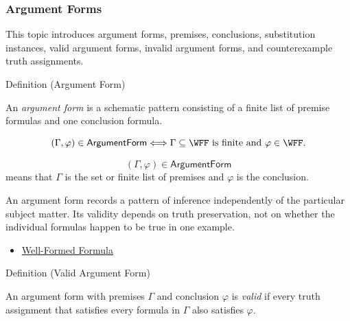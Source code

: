 \subsubsection*{Argument Forms}

\begin{remark*}
This topic introduces argument forms, premises, conclusions, substitution
instances, valid argument forms, invalid argument forms, and counterexample
truth assignments.
\end{remark*}

\begin{definitionbox}{Definition (Argument Form)}
\begin{definition}
\label{def:argument-form-propositional-logic}
An \emph{argument form} is a schematic pattern consisting of a finite list of
premise formulas and one conclusion formula.
\end{definition}
\end{definitionbox}

\begin{remark*}
\[
(\Gamma,\varphi)\in\mathsf{ArgumentForm}
\Longleftrightarrow
\Gamma\subseteq\WFF\text{ is finite and }\varphi\in\WFF.
\]
\end{remark*}

\begin{remark*}
\[
  (\Gamma,\varphi)\in\mathsf{ArgumentForm}
\] means that \(\Gamma\) is the set
or finite list of premises and \(\varphi\) is the conclusion.
\end{remark*}

\begin{remark*}[Interpretation]
An argument form records a pattern of inference independently of the particular
subject matter. Its validity depends on truth preservation, not on whether the
individual formulas happen to be true in one example.
\end{remark*}

\begin{dependencies}
\begin{itemize}
  \item \hyperref[def:well-formed-formula]{Well-Formed Formula}
\end{itemize}
\end{dependencies}

\begin{definitionbox}{Definition (Valid Argument Form)}
\begin{definition}
\label{def:valid-argument-form-propositional-logic}
An argument form with premises \(\Gamma\) and conclusion \(\varphi\) is
\emph{valid} if every truth assignment that satisfies every formula in
\(\Gamma\) also satisfies \(\varphi\).
\end{definition}
\end{definitionbox}

